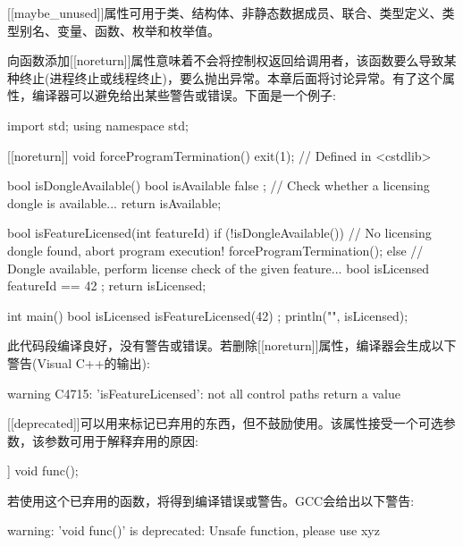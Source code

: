[[maybe\_unused]]属性可用于类、结构体、非静态数据成员、联合、类型定义、类型别名、变量、函数、枚举和枚举值。

\mySamllsection{[[noreturn]]}

向函数添加[[noreturn]]属性意味着不会将控制权返回给调用者，该函数要么导致某种终止(进程终止或线程终止)，要么抛出异常。本章后面将讨论异常。有了这个属性，编译器可以避免给出某些警告或错误。下面是一个例子:

\begin{cpp}
import std;
using namespace std;

[[noreturn]] void forceProgramTermination()
{
    exit(1); // Defined in <cstdlib>
}

bool isDongleAvailable()
{
    bool isAvailable { false };
    // Check whether a licensing dongle is available...
    return isAvailable;
}

bool isFeatureLicensed(int featureId)
{
    if (!isDongleAvailable()) {
        // No licensing dongle found, abort program execution!
        forceProgramTermination();
    } else {
        // Dongle available, perform license check of the given feature...
        bool isLicensed { featureId == 42 };
        return isLicensed;
    }
}

int main()
{
    bool isLicensed { isFeatureLicensed(42) };
    println("{}", isLicensed);
}
\end{cpp}

此代码段编译良好，没有警告或错误。若删除[[noreturn]]属性，编译器会生成以下警告(Visual C++的输出):

\begin{shell}
warning C4715: 'isFeatureLicensed': not all control paths return a value
\end{shell}

\mySamllsection{[[deprecated]]}

[[deprecated]]可以用来标记已弃用的东西，但不鼓励使用。该属性接受一个可选参数，该参数可用于解释弃用的原因:

\begin{cpp}
[[deprecated("Unsafe function, please use xyz")]] void func();
\end{cpp}

若使用这个已弃用的函数，将得到编译错误或警告。GCC会给出以下警告:

\begin{shell}
warning: 'void func()' is deprecated: Unsafe function, please use xyz
\end{shell}


